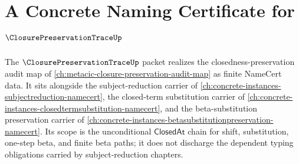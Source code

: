 \chapter{A Concrete Naming Certificate for $\ClosurePreservationTraceUp$}
\label{ch:concrete-instances-closurepreservationtrace-namecert}

The $\ClosurePreservationTraceUp$ packet realizes the closedness-preservation audit map of \autoref{ch:metacic-closure-preservation-audit-map} as finite NameCert data. It sits alongside the subject-reduction carrier of \autoref{ch:concrete-instances-subjectreduction-namecert}, the closed-term substitution carrier of \autoref{ch:concrete-instances-closedtermsubstitution-namecert}, and the beta-substitution preservation carrier of \autoref{ch:concrete-instances-betasubstitutionpreservation-namecert}. Its scope is the unconditional $\mathsf{ClosedAt}$ chain for shift, substitution, one-step beta, and finite beta paths; it does not discharge the dependent typing obligations carried by subject-reduction chapters.

